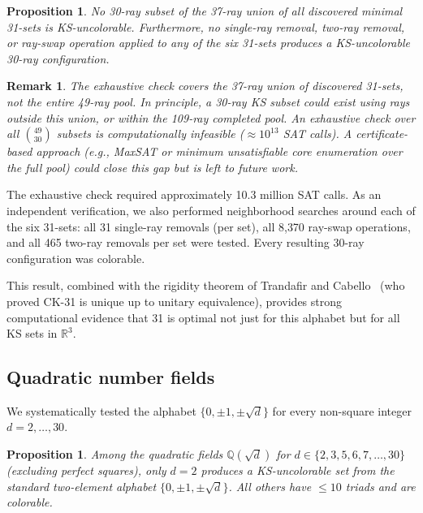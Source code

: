 \documentclass[12pt,a4paper]{article}
\newtheorem{proposition}[theorem]{Proposition}
\newtheorem{remark}[theorem]{Remark}
\newcommand{\R}{\mathbb{R}}
\newcommand{\Q}{\mathbb{Q}}
\begin{document}
\begin{proposition}\label{prop:31optimal}
No 30-ray subset of the 37-ray union of all discovered minimal 31-sets is KS-uncolorable. Furthermore, no single-ray removal, two-ray removal, or ray-swap operation applied to any of the six 31-sets produces a KS-uncolorable 30-ray configuration.
\end{proposition}

\begin{remark}
The exhaustive check covers the 37-ray union of discovered 31-sets, not the entire 49-ray pool. In principle, a 30-ray KS subset could exist using rays outside this union, or within the 109-ray completed pool. An exhaustive check over all $\binom{49}{30}$ subsets is computationally infeasible ($\approx 10^{13}$ SAT calls). A certificate-based approach (e.g., MaxSAT or minimum unsatisfiable core enumeration over the full pool) could close this gap but is left to future work.
\end{remark}

The exhaustive check required approximately 10.3 million SAT calls. As an independent verification, we also performed neighborhood searches around each of the six 31-sets: all 31 single-ray removals (per set), all 8{,}370 ray-swap operations, and all 465 two-ray removals per set were tested. Every resulting 30-ray configuration was colorable.

This result, combined with the rigidity theorem of Trandafir and Cabello~\cite{TrandafirCabello2025} (who proved CK-31 is unique up to unitary equivalence), provides strong computational evidence that 31 is optimal not just for this alphabet but for all KS sets in $\R^3$.

\subsection{Quadratic number fields}\label{sec:quadratic}

We systematically tested the alphabet $\{0, \pm 1, \pm\sqrt{d}\}$ for every non-square integer $d = 2, \ldots, 30$.

\begin{proposition}\label{prop:quadratic}
Among the quadratic fields $\Q(\sqrt{d})$ for $d \in \{2, 3, 5, 6, 7, \ldots, 30\}$ (excluding perfect squares), only $d = 2$ produces a KS-uncolorable set from the standard two-element alphabet $\{0, \pm 1, \pm\sqrt{d}\}$. All others have $\leq 10$ triads and are colorable.
\end{proposition}
\end{document}
